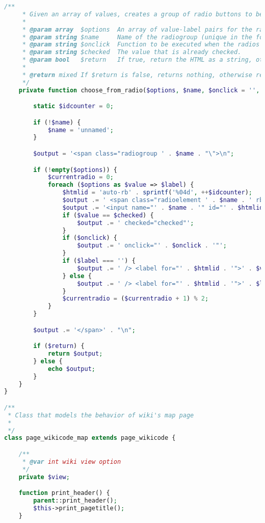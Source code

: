 \begin{lstlisting}[language=PHP]
    /**
     * Given an array of values, creates a group of radio buttons to be part of a form
     *
     * @param array  $options  An array of value-label pairs for the radio group (values as keys).
     * @param string $name     Name of the radiogroup (unique in the form).
     * @param string $onclick  Function to be executed when the radios are clicked.
     * @param string $checked  The value that is already checked.
     * @param bool   $return   If true, return the HTML as a string, otherwise print it.
     *
     * @return mixed If $return is false, returns nothing, otherwise returns a string of HTML.
     */
    private function choose_from_radio($options, $name, $onclick = '', $checked = '', $return = false) {

        static $idcounter = 0;

        if (!$name) {
            $name = 'unnamed';
        }

        $output = '<span class="radiogroup ' . $name . "\">\n";

        if (!empty($options)) {
            $currentradio = 0;
            foreach ($options as $value => $label) {
                $htmlid = 'auto-rb' . sprintf('%04d', ++$idcounter);
                $output .= ' <span class="radioelement ' . $name . ' rb' . $currentradio . "\">";
                $output .= '<input name="' . $name . '" id="' . $htmlid . '" type="radio" value="' . $value . '"';
                if ($value == $checked) {
                    $output .= ' checked="checked"';
                }
                if ($onclick) {
                    $output .= ' onclick="' . $onclick . '"';
                }
                if ($label === '') {
                    $output .= ' /> <label for="' . $htmlid . '">' . $value . '</label></span>' . "\n";
                } else {
                    $output .= ' /> <label for="' . $htmlid . '">' . $label . '</label></span>' . "\n";
                }
                $currentradio = ($currentradio + 1) % 2;
            }
        }

        $output .= '</span>' . "\n";

        if ($return) {
            return $output;
        } else {
            echo $output;
        }
    }
}

/**
 * Class that models the behavior of wiki's map page
 *
 */
class page_wikicode_map extends page_wikicode {

    /**
     * @var int wiki view option
     */
    private $view;

    function print_header() {
        parent::print_header();
        $this->print_pagetitle();
    }


\end{lstlisting}
